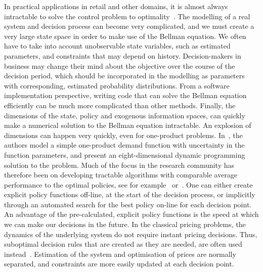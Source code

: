 \documentclass{rsproca_new}
\theoremstyle{definition}
\begin{document}
In practical applications in retail and other domains, it is almost always
intractable to solve the control problem to optimality~\cite{farmer2017uncertainty}.
The modelling of a real system and decision process can become very
complicated, and  we must  create a very
large state space in order to make use of the Bellman equation.
We often have to take into account unobservable
state variables, such as estimated parameters, and constraints
that may depend on history. Decision-makers in business may change their mind
about the objective over the course of the decision period, which should
be incorporated in the modelling as parameters with corresponding, estimated
probability distributions.
From a software implementation perspective, writing code that can
solve the Bellman equation efficiently can be much more complicated
than other methods.
Finally, the dimensions of the state, policy and exogenous
information spaces, can quickly make a numerical solution to the Bellman
equation intractable. An explosion of dimensions can happen very
quickly, even for one-product problems.
In~\cite{bertsimas2001dynamic}, the authors model a simple
one-product demand function with uncertainty in the function
parameters, and present an eight-dimensional dynamic programming
solution to the problem.
Much of the focus in the research community has therefore been on
developing tractable algorithms with comparable average performance to the
optimal policies, see for
example~\cite{powell2011approximate} or~\cite{bertsekas2012dynamic}.
One can either create explicit policy functions off-line, at the
start of the decision process, or implicitly through an automated
search for the best policy on-line for each decision point.
An advantage of the pre-calculated, explicit policy functions
is the speed at which we can make our decisions in the
future. In the classical pricing problems, the dynamics of the
underlying system do not require instant pricing decisions. Thus,
suboptimal decision rules that are created as they are needed, are often used
instead~\cite{talluri2006theory}. Estimation of the system and optimisation of prices are
normally separated, and constraints are more easily updated at each
decision point.
\end{document}
